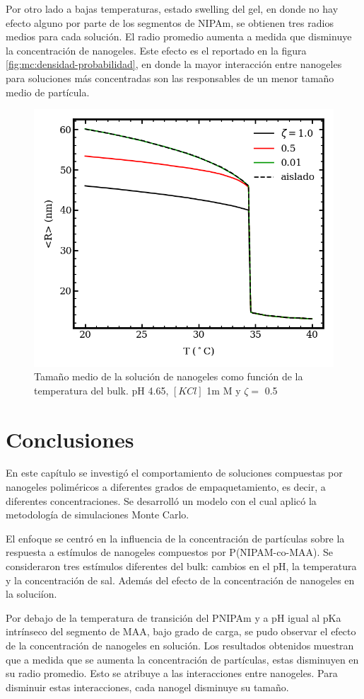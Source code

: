 	Por otro lado a bajas temperaturas, estado swelling del gel, en donde no hay efecto alguno por parte de los segmentos de NIPAm, se obtienen tres radios medios para cada soluci\'on. El radio promedio aumenta a medida que disminuye la concentraci\'on de nanogeles. Este efecto es el reportado en la figura \ref{fig:mc:densidad-probabilidad}, en donde la mayor interacci\'on entre nanogeles para soluciones m\'as concentradas son las responsables de un menor tama\~no medio de part\'icula.
	
	
	
	\begin{figure}[!htb]
		\centering
		\includegraphics[width=0.45\linewidth]{Figures/graph-mc/rvst.png}
		\caption{Tama\~no medio de la soluci\'on de nanogeles como funci\'on de la temperatura del bulk. pH 4.65, $[KCl]$ 1m M y  $\zeta =$ 0.5}
		\label{fig:mc:temperatura-r}
	\end{figure}
	
	\section{Conclusiones}
	En este cap\'itulo se investig\'o el comportamiento de soluciones compuestas por nanogeles polim\'ericos a diferentes grados de empaquetamiento, es decir, a diferentes concentraciones. Se desarroll\'o un modelo con el cual aplic\'o la metodolog\'ia de simulaciones Monte Carlo.
	
	El enfoque se centr\'o en la influencia de la concentraci\'on de part\'iculas sobre la respuesta a est\'imulos de nanogeles compuestos por P(NIPAM-co-MAA). Se consideraron tres est\'imulos diferentes del bulk: cambios en el pH, la temperatura y la concentraci\'on de sal. Adem\'as del efecto de la concentraci\'on de nanogeles en la soluci\'ion.
	
	Por debajo de la temperatura de transición del PNIPAm y a pH igual al pKa intr\'inseco del segmento de MAA, bajo grado de carga, se pudo observar el efecto de la concentraci\'on de nanogeles en soluci\'on.
	Los resultados obtenidos muestran que a medida que se aumenta la concentraci\'on de part\'iculas, estas disminuyen en su radio promedio. Esto se atribuye a las interacciones entre nanogeles. Para disminuir estas interacciones, cada nanogel disminuye su tama\~no.%
	
